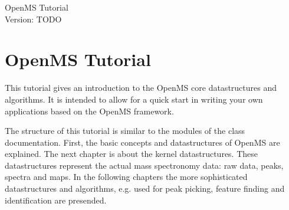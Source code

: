 \documentclass[a4paper]{article}
\begin{document}
\begin{titlepage}
\vspace*{7cm}
\begin{center}
{\Large Open\-MS Tutorial\\[1ex]\large Version: TODO }\\
\end{center}
\end{titlepage}

\section{Open\-MS Tutorial}

This tutorial gives an introduction to the OpenMS core datastructures and algorithms.
It is intended to allow for a quick start in writing your own applications based on
the OpenMS framework.

The structure of this tutorial is similar to the modules of the class documentation.
First, the basic concepts and datastructures of OpenMS are explained. The next chapter is
about the kernel datastructures. These datastructures represent the actual mass spectronomy
data: raw data, peaks, spectra and maps. In the following chapters the more sophisticated 
datastructures and algorithms, e.g. used for peak picking, feature finding and identification
are presended.

\pagebreak

\pagebreak

\pagebreak

\end{document}
